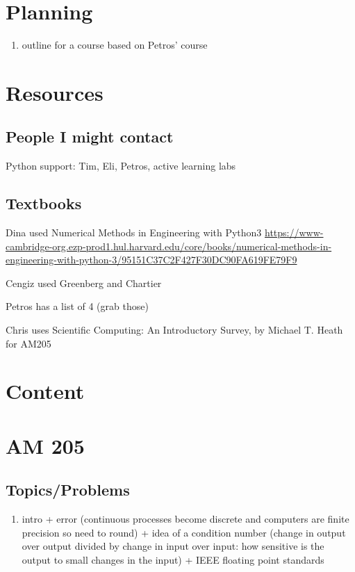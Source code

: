 \documentclass[12pt,letterpaper]{exam}
\begin{document}
\pdfpageheight 11in 
\pdfpagewidth 8.5in

\section{Planning}
\begin{enumerate}
\itemsep0pt
    \item outline for a course based on Petros' course
\end{enumerate}

\section{Resources}
\subsection{People I might contact}
Python support: Tim, Eli, Petros, active learning labs


\subsection{Textbooks}

Dina used Numerical Methods in Engineering with Python3 \url{https://www-cambridge-org.ezp-prod1.hul.harvard.edu/core/books/numerical-methods-in-engineering-with-python-3/95151C37C2F427F30DC90FA619FE79F9}

Cengiz used Greenberg and Chartier

Petros has a list of 4 (grab those)

Chris uses Scientific Computing: An Introductory Survey, by Michael T. Heath for AM205

\section{Content}
\subsection{}

\section{AM 205}
\subsection{Topics/Problems}
\begin{enumerate}
\itemsep0pt
    \item intro + error (continuous processes become discrete and computers are finite precision so need to round) + idea of a condition number (change in output over output divided by change in input over input: how sensitive is the output to small changes in the input) + IEEE floating point standards
\end{enumerate}
\end{document}
